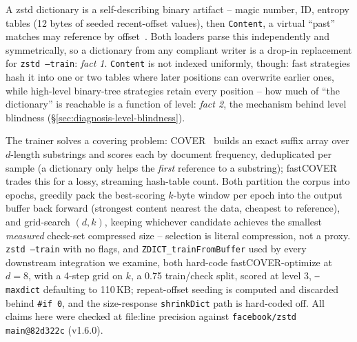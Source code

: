\documentclass[12pt]{article}
\begin{document}
A zstd dictionary is a self-describing binary artifact -- magic number,
ID, entropy tables (12 bytes of seeded recent-offset values), then
\texttt{Content}, a virtual ``past'' matches may reference by
offset~\cite{rfc8878}. Both loaders parse this independently and
symmetrically, so a dictionary from any compliant writer is a drop-in
replacement for \texttt{zstd --train}: \emph{fact 1}. \texttt{Content}
is not indexed uniformly, though: fast strategies hash it into one or
two tables where later positions can overwrite earlier ones, while
high-level binary-tree strategies retain every position -- how much of
``the dictionary'' is reachable is a function of level: \emph{fact 2},
the mechanism behind level blindness (\S\ref{sec:diagnosis-level-blindness}).

The trainer solves a covering problem: COVER~\cite{liao2016cover} builds
an exact suffix array over $d$-length substrings and scores each by
document frequency, deduplicated per sample (a dictionary only helps
the \emph{first} reference to a substring); fastCOVER trades this for a
lossy, streaming hash-table count. Both partition the corpus into
epochs, greedily pack the best-scoring $k$-byte window per epoch into
the output buffer back forward (strongest content nearest the data,
cheapest to reference), and grid-search $(d,k)$, keeping whichever
candidate achieves the smallest \emph{measured} check-set compressed
size -- selection is literal compression, not a proxy. \texttt{zstd
--train} with no flags, and \texttt{ZDICT\_trainFromBuffer} used by
every downstream integration we examine, both hard-code
fastCOVER-optimize at $d{=}8$, with a 4-step grid on $k$, a 0.75
train/check split, scored at level 3, \texttt{--maxdict} defaulting to
110\,KB; repeat-offset seeding is computed and discarded behind
\texttt{\#if 0}, and the size-response \texttt{shrinkDict} path is
hard-coded off. All claims here were checked at file:line precision
against \texttt{facebook/zstd main@82d322c} (v1.6.0).
\end{document}
